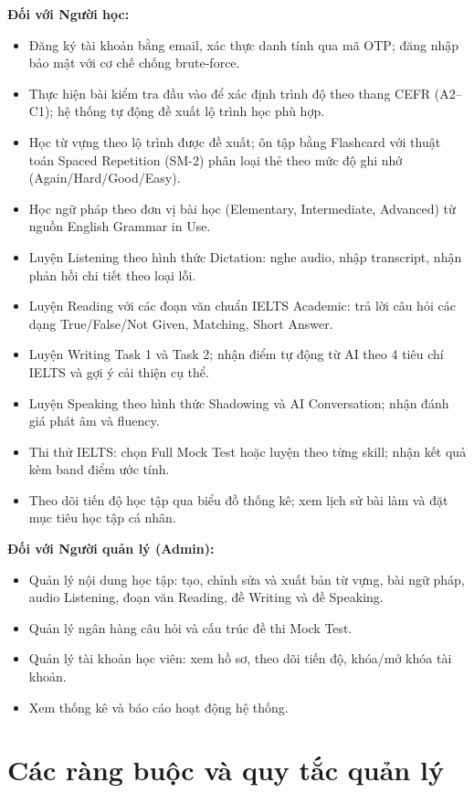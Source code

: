 \documentclass[a4paper,12pt]{extreport}
\begin{document}
\textbf{Đối với Người học:}
\begin{itemize}
    \item Đăng ký tài khoản bằng email, xác thực danh tính qua mã OTP; đăng nhập bảo mật với cơ chế chống brute-force.
    \item Thực hiện bài kiểm tra đầu vào để xác định trình độ theo thang CEFR (A2–C1); hệ thống tự động đề xuất lộ trình học phù hợp.
    \item Học từ vựng theo lộ trình được đề xuất; ôn tập bằng Flashcard với thuật toán Spaced Repetition (SM-2) phân loại thẻ theo mức độ ghi nhớ (Again/Hard/Good/Easy).
    \item Học ngữ pháp theo đơn vị bài học (Elementary, Intermediate, Advanced) từ nguồn English Grammar in Use.
    \item Luyện Listening theo hình thức Dictation: nghe audio, nhập transcript, nhận phản hồi chi tiết theo loại lỗi.
    \item Luyện Reading với các đoạn văn chuẩn IELTS Academic: trả lời câu hỏi các dạng True/False/Not Given, Matching, Short Answer.
    \item Luyện Writing Task 1 và Task 2; nhận điểm tự động từ AI theo 4 tiêu chí IELTS và gợi ý cải thiện cụ thể.
    \item Luyện Speaking theo hình thức Shadowing và AI Conversation; nhận đánh giá phát âm và fluency.
    \item Thi thử IELTS: chọn Full Mock Test hoặc luyện theo từng skill; nhận kết quả kèm band điểm ước tính.
    \item Theo dõi tiến độ học tập qua biểu đồ thống kê; xem lịch sử bài làm và đặt mục tiêu học tập cá nhân.
\end{itemize}

\textbf{Đối với Người quản lý (Admin):}
\begin{itemize}
    \item Quản lý nội dung học tập: tạo, chỉnh sửa và xuất bản từ vựng, bài ngữ pháp, audio Listening, đoạn văn Reading, đề Writing và đề Speaking.
    \item Quản lý ngân hàng câu hỏi và cấu trúc đề thi Mock Test.
    \item Quản lý tài khoản học viên: xem hồ sơ, theo dõi tiến độ, khóa/mở khóa tài khoản.
    \item Xem thống kê và báo cáo hoạt động hệ thống.
\end{itemize}

\section{Các ràng buộc và quy tắc quản lý}
\end{document}
